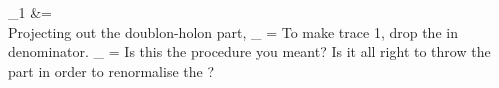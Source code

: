 \documentclass[17pt]{extarticle}
\begin{document}
\beq
\rho_1 &= \\
\eeq
Projecting out the doublon-holon part,
\beq
\rho_ = \rr{\ket{\ua}\bra{\ua}+ \ket{\da}\bra{\da}}
\eeq
To make trace 1, drop the  in denominator.
\beq
\rho_ = \rr{\ket{\ua}\bra{\ua}+ \ket{\da}\bra{\da}}
\eeq
Is this the procedure you meant? Is it all right to throw the \il{\alpha} part in order to renormalise the ?
\end{document}
